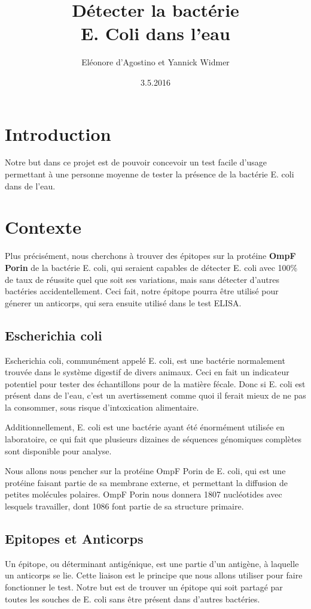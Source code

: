 \documentclass{article}
\title{Détecter la bactérie\\ {\huge E. Coli} dans l'eau}
\date{3.5.2016}
\author{Eléonore d'Agostino et Yannick Widmer}
\begin{document}
  \maketitle
  \tableofcontents
  \newpage
  
  \section{Introduction}
    Notre but dans ce projet est de pouvoir concevoir un test facile d'usage permettant à une personne moyenne de tester la présence de la bactérie E. coli dans de l'eau.
    
  \section{Contexte}
    Plus précisément, nous cherchons à trouver des épitopes sur la protéine \textbf{OmpF Porin} de la bactérie E. coli, qui seraient capables de détecter E. coli avec 100\% de taux de réussite quel que soit ses variations, mais sans détecter d'autres bactéries accidentellement. Ceci fait, notre épitope pourra être utilisé pour génerer un anticorps, qui sera ensuite utilisé dans le test ELISA.
    
    \subsection{Escherichia coli}
      Escherichia coli, communément appelé E. coli, est une bactérie normalement trouvée dans le système digestif de divers animaux. Ceci en fait un indicateur potentiel pour tester des échantillons pour de la matière fécale. Donc si E. coli est présent dans de l'eau, c'est un avertissement comme quoi il ferait mieux de ne pas la consommer, sous risque d'intoxication alimentaire.
      
      Additionnellement, E. coli est une bactérie ayant été énormément utilisée en laboratoire, ce qui fait que plusieurs dizaines de séquences génomiques complètes sont disponible pour analyse.
      
      Nous allons nous pencher sur la protéine OmpF Porin de E. coli, qui est une protéine faisant partie de sa membrane externe, et permettant la diffusion de petites molécules polaires. OmpF Porin nous donnera 1807 nucléotides avec lesquels travailler, dont 1086 font partie de sa structure primaire.
      
    \subsection{Epitopes et Anticorps}
      Un épitope, ou déterminant antigénique, est une partie d'un antigène, à laquelle un anticorps se lie. Cette liaison est le principe que nous allons utiliser pour faire fonctionner le test. Notre but est de trouver un épitope qui soit partagé par toutes les souches de E. coli sans être présent dans d'autres bactéries.
      
\end{document}
